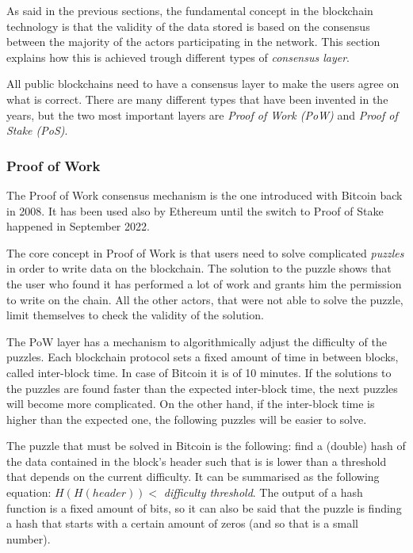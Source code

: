 As said in the previous sections, the fundamental concept in the blockchain technology is that the validity of the data stored is based on the consensus between the majority of the actors participating in the network. This section explains how this is achieved trough different types of \textit{consensus layer}.

All public blockchains need to have a consensus layer to make the users agree on what is correct. There are many different types that have been invented in the years, but the two most important layers are \textit{Proof of Work (PoW)} and \textit{Proof of Stake (PoS)}.

\subsubsection{Proof of Work}

The Proof of Work consensus mechanism is the one introduced with Bitcoin back in 2008. It has been used also by Ethereum until the switch to Proof of Stake happened in September 2022. 

The core concept in Proof of Work is that users need to solve complicated \textit{puzzles} in order to write data on the blockchain. The solution to the puzzle shows that the user who found it has performed a lot of work and grants him the permission to write on the chain. All the other actors, that were not able to solve the puzzle, limit themselves to check the validity of the solution.

The PoW layer has a mechanism to algorithmically adjust the difficulty of the puzzles. Each blockchain protocol sets a fixed amount of time in between blocks, called inter-block time. In case of Bitcoin it is of 10 minutes. If the solutions to the puzzles are found faster than the expected inter-block time, the next puzzles will become more complicated. On the other hand, if the inter-block time is higher than the expected one, the following puzzles will be easier to solve.

The puzzle that must be solved in Bitcoin is the following: find a (double) hash of the data contained in the block's header such that is is lower than a threshold that depends on the current difficulty. It can be summarised as the following equation: $H(H(header)) < $ \textit{difficulty threshold}. The output of a hash function is a fixed amount of bits, so it can also be said that the puzzle is finding a hash that starts with a certain amount of zeros (and so that is a small number).

